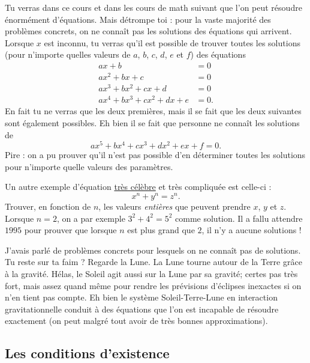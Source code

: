 \begin{remark}
Tu verras dans ce cours et dans les cours de math suivant que l'on peut résoudre énormément d'équations. Mais détrompe toi : pour la vaste majorité des problèmes concrets, on ne connaît pas les solutions des équations qui arrivent. Lorsque $x$ est inconnu, tu verras qu'il est possible de trouver toutes les solutions (pour n'importe quelles valeurs de $a$, $b$, $c$, $d$, $e$ et $f$) des équations
\begin{align*}
ax+b&=0\\
ax^{2}+bx+c&=0\\
ax^{3}+bx^{2}+cx+d&=0\\
ax^{4}+bx^{3}+cx^{2}+dx+e&=0.
\end{align*}
En fait tu ne verras que les deux premières, mais il se fait que les deux suivantes sont également possibles. Eh bien il se fait que personne ne connaît les solutions de
\[ 
  ax^{5}+bx^{4}+cx^{3}+dx^{2}+ex+f=0.
\]
Pire : on a pu prouver qu'il n'est pas possible d'en déterminer toutes les solutions pour n'importe quelle valeurs des paramètres.

Un autre exemple d'équation \href{http://fr.wikipedia.org/wiki/Dernier_théorème_de_Fermat}{très célèbre} et très compliquée est celle-ci :
\[ 
  x^{n}+y^{n}=z^{n}.
\]
Trouver, en fonction de $n$, les valeurs \emph{entières} que peuvent prendre $x$, $y$ et $z$. Lorsque $n=2$, on a par exemple $3^{2}+4^{2}=5^{2}$ comme solution. Il a fallu attendre $1995$ pour prouver que lorsque $n$ est plus grand que $2$, il n'y a aucune solutions !

J'avais parlé de problèmes concrets pour lesquels on ne connaît pas de solutions. Tu reste sur ta faim ? Regarde la Lune. La Lune tourne autour de la Terre grâce à la gravité. Hélas, le Soleil agit aussi sur la Lune par sa gravité; certes pas très fort, mais assez quand même pour rendre les prévisions d'éclipses inexactes si on n'en tient pas compte. Eh bien le système Soleil-Terre-Lune en interaction gravitationnelle conduit à des équations que l'on est incapable de résoudre exactement (on peut malgré tout avoir de très bonnes approximations).
\end{remark}

\subsection{Les conditions d'existence}

